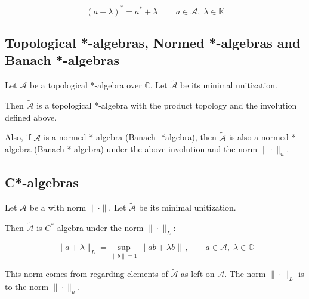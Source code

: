 \documentclass[12pt]{article}
\begin{document}
\begin{displaymath}
(a+\lambda)^* = a^* + \overline{\lambda}\, \qquad a \in \mathcal{A} ,\; \lambda \in \mathbb{K}
\end{displaymath}

\subsection{Topological *-algebras, Normed *-algebras and Banach *-algebras}

Let $\mathcal{A}$ be a topological *-algebra over $\mathbb{C}$. Let $\widetilde{\mathcal{A}}$ be its minimal unitization.

Then $\widetilde{\mathcal{A}}$ is a topological *-algebra with the product topology and the involution defined above.

Also, if $\mathcal{A}$ is a normed *-algebra (Banach -*algebra), then $\widetilde{\mathcal{A}}$ is also a normed *-algebra (Banach *-algebra) under the above involution and the norm $\|\cdot\|_u$.

\subsection{C*-algebras}

Let $\mathcal{A}$ be a  with norm $\| \cdot \|$. Let $\widetilde{\mathcal{A}}$ be its minimal unitization.

Then $\widetilde{\mathcal{A}}$ is $C^*$-algebra under the norm $\| \cdot \|_L$:

\begin{displaymath}
\|a+\lambda\|_L = \sup_{\|b\|=1}\|ab +\lambda b\|\,, \qquad a \in \mathcal{A} ,\; \lambda \in \mathbb{C}
\end{displaymath}

This norm comes from regarding elements of $\widetilde{\mathcal{A}}$ as left  on $\mathcal{A}$. The norm $\| \cdot \|_L$ is  to the norm $\| \cdot \|_u$.
\end{document}
